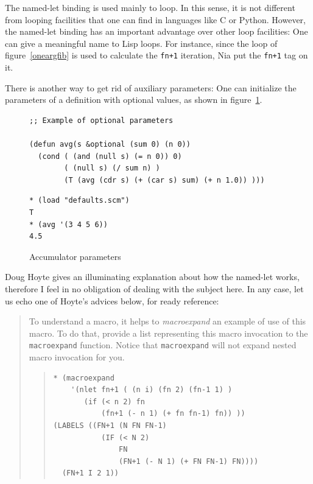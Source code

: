 \documentclass[a4paper,12pt]{book}
\newenvironment{fmpage}[1]
           {\begin{lrbox}{\fmbox}\begin{minipage}{#1}}
           {\end{minipage}\end{lrbox}\fbox{\usebox{\fmbox}}}
\begin{document}
The named-let binding is used mainly
to loop. In this sense, it is not
different from looping facilities
that one can find in languages like C
or Python. However, the named-let
binding has an important advantage
over other loop facilities: One can
give a meaningful name
to Lisp loops. For instance, since the loop of
figure~\ref{oneargfib} is used  to calculate
the \verb|fn+1| iteration, Nia put the
\verb|fn+1| tag on it.

There is another way to get rid of auxiliary 
parameters:
One can initialize the parameters of a definition with
optional values,
as shown in figure~\ref{accumulators}.

\begin{figure}[!h]
\begin{fmpage}{\linewidth}
\begin{verbatim}
;; Example of optional parameters

(defun avg(s &optional (sum 0) (n 0))
  (cond ( (and (null s) (= n 0)) 0)
        ( (null s) (/ sum n) )
        (T (avg (cdr s) (+ (car s) sum) (+ n 1.0)) )))
\end{verbatim}
\end{fmpage}

\begin{fmpage}{\linewidth}
\begin{verbatim}
* (load "defaults.scm")
T
* (avg '(3 4 5 6))
4.5
\end{verbatim}
\end{fmpage}
\caption{Accumulator parameters}
\label{accumulators}
\end{figure}

Doug Hoyte\cite{Hoyte} gives an illuminating explanation
about how the named-let works, therefore I feel in no
obligation of dealing with the subject here. In any case,
let us echo one of Hoyte's advices below, for ready reference:
\begin{quotation}
To understand a macro, it helps to {\em macroexpand}
an example of use of this macro. To do that, provide
a list representing this macro invocation to the
\verb|macroexpand| function. Notice that
\verb|macroexpand| will not expand nested macro
invocation for you.
\begin{quote}
\begin{verbatim}
* (macroexpand 
    '(nlet fn+1 ( (n i) (fn 2) (fn-1 1) )
       (if (< n 2) fn
           (fn+1 (- n 1) (+ fn fn-1) fn)) ))
(LABELS ((FN+1 (N FN FN-1)
           (IF (< N 2)
               FN
               (FN+1 (- N 1) (+ FN FN-1) FN))))
  (FN+1 I 2 1))
\end{verbatim}
\end{quote}
\end{quotation}
\end{document}
